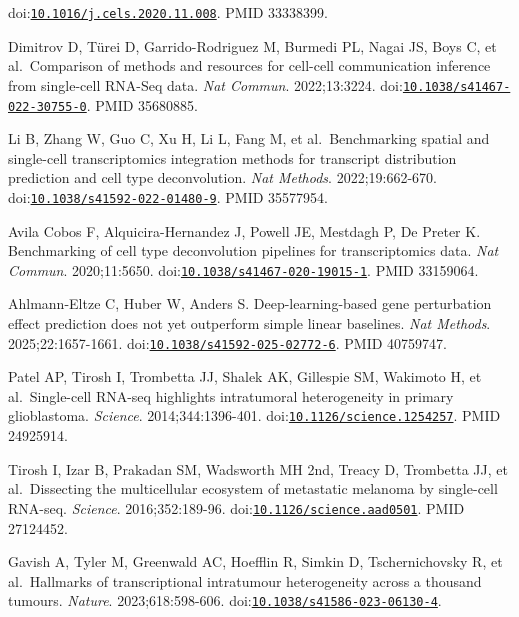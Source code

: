 \documentclass[11pt]{article}
\begin{document}
\begin{enumerate}[label={[\arabic*]},leftmargin=2.6em,labelsep=0.5em,itemsep=1.5pt]
  doi:\href{https://doi.org/10.1016/j.cels.2020.11.008}{\nolinkurl{10.1016/j.cels.2020.11.008}}.
  PMID 33338399.
\item
  Dimitrov D, Türei D, Garrido-Rodriguez M, Burmedi PL, Nagai JS, Boys
  C, et al.~Comparison of methods and resources for cell-cell
  communication inference from single-cell RNA-Seq data. \emph{Nat
  Commun}. 2022;13:3224.
  doi:\href{https://doi.org/10.1038/s41467-022-30755-0}{\nolinkurl{10.1038/s41467-022-30755-0}}.
  PMID 35680885.
\item
  Li B, Zhang W, Guo C, Xu H, Li L, Fang M, et al.~Benchmarking spatial
  and single-cell transcriptomics integration methods for transcript
  distribution prediction and cell type deconvolution. \emph{Nat
  Methods}. 2022;19:662-670.
  doi:\href{https://doi.org/10.1038/s41592-022-01480-9}{\nolinkurl{10.1038/s41592-022-01480-9}}.
  PMID 35577954.
\item
  Avila Cobos F, Alquicira-Hernandez J, Powell JE, Mestdagh P, De Preter
  K. Benchmarking of cell type deconvolution pipelines for
  transcriptomics data. \emph{Nat Commun}. 2020;11:5650.
  doi:\href{https://doi.org/10.1038/s41467-020-19015-1}{\nolinkurl{10.1038/s41467-020-19015-1}}.
  PMID 33159064.
\item
  Ahlmann-Eltze C, Huber W, Anders S. Deep-learning-based gene
  perturbation effect prediction does not yet outperform simple linear
  baselines. \emph{Nat Methods}. 2025;22:1657-1661.
  doi:\href{https://doi.org/10.1038/s41592-025-02772-6}{\nolinkurl{10.1038/s41592-025-02772-6}}.
  PMID 40759747.
\item
  Patel AP, Tirosh I, Trombetta JJ, Shalek AK, Gillespie SM, Wakimoto H,
  et al.~Single-cell RNA-seq highlights intratumoral heterogeneity in
  primary glioblastoma. \emph{Science}. 2014;344:1396-401.
  doi:\href{https://doi.org/10.1126/science.1254257}{\nolinkurl{10.1126/science.1254257}}.
  PMID 24925914.
\item
  Tirosh I, Izar B, Prakadan SM, Wadsworth MH 2nd, Treacy D, Trombetta
  JJ, et al.~Dissecting the multicellular ecosystem of metastatic
  melanoma by single-cell RNA-seq. \emph{Science}. 2016;352:189-96.
  doi:\href{https://doi.org/10.1126/science.aad0501}{\nolinkurl{10.1126/science.aad0501}}.
  PMID 27124452.
\item
  Gavish A, Tyler M, Greenwald AC, Hoefflin R, Simkin D, Tschernichovsky
  R, et al.~Hallmarks of transcriptional intratumour heterogeneity
  across a thousand tumours. \emph{Nature}. 2023;618:598-606.
  doi:\href{https://doi.org/10.1038/s41586-023-06130-4}{\nolinkurl{10.1038/s41586-023-06130-4}}.

\end{enumerate}
\end{document}
